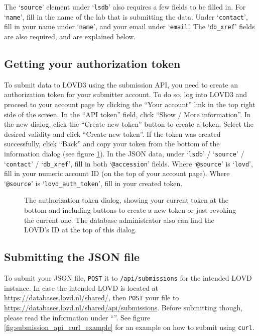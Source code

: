 The `\texttt{source}' element under `\texttt{lsdb}' also requires a few fields to be filled in.
For `\texttt{name}', fill in the name of the lab that is submitting the data.
Under `\texttt{contact}', fill in your name under `\texttt{name}', and your email under `\texttt{email}'.
The `\texttt{db\_xref}' fields are also required, and are explained below.



\subsection{Getting your authorization token}
\label{ssec:getting_your_auth_token}
To submit data to LOVD3 using the submission API, you need to create an authorization token for your submitter account.
To do so, log into LOVD3 and proceed to your account page
 by clicking the ``Your account'' link in the top right side of the screen.
In the ``API token'' field, click ``Show / More information''.
In the new dialog, click the ``Create new token'' button to create a token.
Select the desired validity and click ``Create new token''.
If the token was created successfully, click ``Back'' and copy your token from the bottom of the information dialog
 (see figure \ref{fig:auth_token_created}).
In the JSON data, under `\texttt{lsdb}' / `\texttt{source}' / `\texttt{contact}' / `\texttt{db\_xref}',
 fill in both `\texttt{@accession}' fields.
Where `\texttt{@source}' is `\texttt{lovd}', fill in your numeric account ID (on the top of your account page).
Where `\texttt{@source}' is `\texttt{lovd\_auth\_token}', fill in your created token.

\begin{figure}[ht]
  \begin{shaded}
  \caption{%
    The authorization token dialog, showing your current token at the bottom
     and including buttons to create a new token or just revoking the current one.
    The database administrator also can find the LOVD's ID at the top of this dialog.}
  \label{fig:auth_token_created}
  \end{shaded}
\end{figure}



\subsection{Submitting the JSON file}
\label{ssec:submitting_the_json_file}
To submit your JSON file, \texttt{POST} it to \texttt{/api/submissions} for the intended LOVD instance.
In case the intended LOVD is located at \url{https://databases.lovd.nl/shared/},
 then \texttt{POST} your file to \url{https://databases.lovd.nl/shared/api/submissions}.
Before submitting though, please read the information under ``''.
See figure \ref{fig:submission_api_curl_example} for an example on how to submit using \texttt{curl}.

